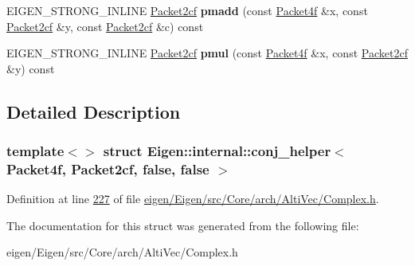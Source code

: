 \begin{DoxyCompactItemize}
E\+I\+G\+E\+N\+\_\+\+S\+T\+R\+O\+N\+G\+\_\+\+I\+N\+L\+I\+NE \hyperlink{struct_eigen_1_1internal_1_1_packet2cf}{Packet2cf} {\bfseries pmadd} (const \hyperlink{struct_eigen_1_1internal_1_1_packet4f}{Packet4f} \&x, const \hyperlink{struct_eigen_1_1internal_1_1_packet2cf}{Packet2cf} \&y, const \hyperlink{struct_eigen_1_1internal_1_1_packet2cf}{Packet2cf} \&c) const
\item 
\mbox{\label{struct_eigen_1_1internal_1_1conj__helper_3_01_packet4f_00_01_packet2cf_00_01false_00_01false_01_4_ac60f7f53396acc85580e6d10091ae895}} 
E\+I\+G\+E\+N\+\_\+\+S\+T\+R\+O\+N\+G\+\_\+\+I\+N\+L\+I\+NE \hyperlink{struct_eigen_1_1internal_1_1_packet2cf}{Packet2cf} {\bfseries pmul} (const \hyperlink{struct_eigen_1_1internal_1_1_packet4f}{Packet4f} \&x, const \hyperlink{struct_eigen_1_1internal_1_1_packet2cf}{Packet2cf} \&y) const
\end{DoxyCompactItemize}


\subsection{Detailed Description}
\subsubsection*{template$<$$>$\newline
struct Eigen\+::internal\+::conj\+\_\+helper$<$ Packet4f, Packet2cf, false, false $>$}



Definition at line \hyperlink{eigen_2_eigen_2src_2_core_2arch_2_alti_vec_2_complex_8h_source_l00227}{227} of file \hyperlink{eigen_2_eigen_2src_2_core_2arch_2_alti_vec_2_complex_8h_source}{eigen/\+Eigen/src/\+Core/arch/\+Alti\+Vec/\+Complex.\+h}.



The documentation for this struct was generated from the following file\+:\begin{DoxyCompactItemize}
\item 
eigen/\+Eigen/src/\+Core/arch/\+Alti\+Vec/\+Complex.\+h\end{DoxyCompactItemize}
